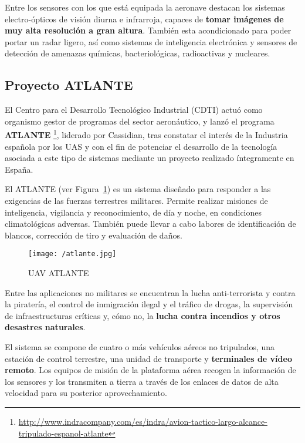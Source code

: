 Entre los sensores con los que está equipada la aeronave destacan los sistemas electro-ópticos de visión diurna e infrarroja, capaces de \textbf{tomar imágenes de muy alta resolución a gran altura}. También esta acondicionado para poder portar un radar ligero, así como sistemas de inteligencia electrónica y sensores de detección de amenazas químicas, bacteriológicas, radioactivas y nucleares.

\subsection{Proyecto ATLANTE}
\label{sec:atlante}

El Centro para el Desarrollo Tecnológico Industrial (CDTI) actuó como organismo gestor de programas del sector aeronáutico, y lanzó el programa \textbf{\acs{ATLANTE}} \footnote{\url{http://www.indracompany.com/es/indra/avion-tactico-largo-alcance-tripulado-espanol-atlante}}, liderado por Cassidian, tras constatar el interés de la Industria española por los \acs{UAS} y con el fin de potenciar el desarrollo de la tecnología asociada a este tipo de sistemas mediante un proyecto realizado íntegramente en España.

El \acs{ATLANTE} (ver Figura~\ref{fig:atlante}) es un sistema diseñado para responder a las exigencias de las fuerzas terrestres militares. Permite realizar misiones de inteligencia, vigilancia y reconocimiento, de día y noche, en condiciones climatológicas adversas. También puede llevar a cabo labores de identificación de blancos, corrección de tiro y evaluación de daños.

\begin{figure}[!h]
\begin{center}
\texttt{[image: /atlante.jpg]}
\caption[\acs{UAV} \acs{ATLANTE}]{\acs{UAV} \acs{ATLANTE}}
\label{fig:atlante}
\end{center}
\end{figure}

Entre las aplicaciones no militares se encuentran la lucha anti-terrorista y contra la piratería, el control de inmigración ilegal y el tráfico de drogas, la supervisión de infraestructuras críticas y, cómo no, la \textbf{lucha contra incendios y otros desastres naturales}.

El sistema se compone de cuatro o más vehículos aéreos no tripulados, una estación de control terrestre, una unidad de transporte y \textbf{terminales de vídeo remoto}. Los equipos de misión de la plataforma aérea recogen la información de los sensores y los transmiten a tierra a través de los enlaces de datos de alta velocidad para su posterior aprovechamiento.

